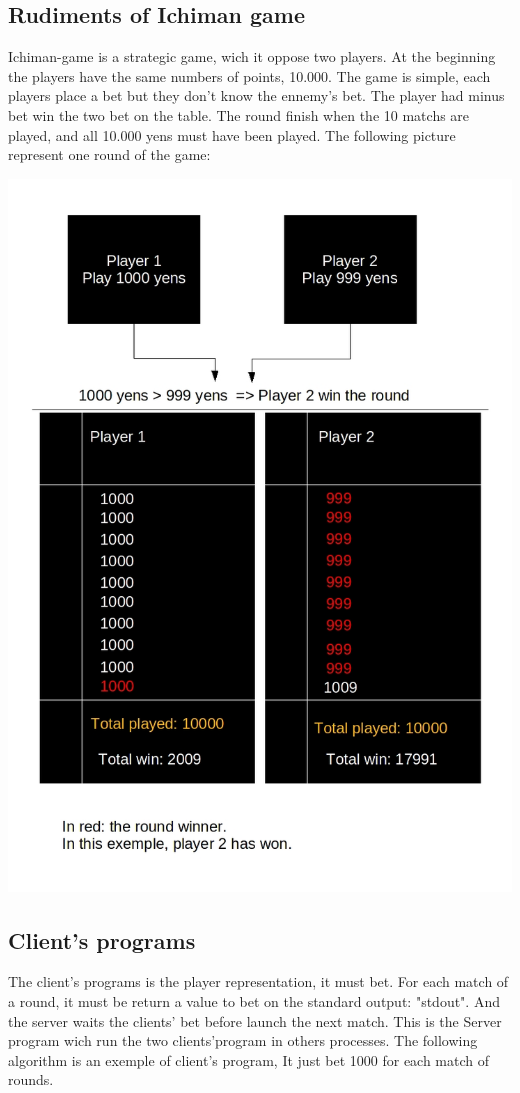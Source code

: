 \documentclass[11pt]{sample}
\begin{document}
\subsection{Rudiments of Ichiman game}
Ichiman-game is a strategic game, wich it oppose two players. At the beginning the players have the same numbers of points, 10.000. The game is simple, each players place a bet but they don't know the ennemy's bet. The player had minus bet win the two bet on the table. The round finish when the 10 matchs are played, and all 10.000 yens must have been played. The following picture represent one round of the game: 
\begin{center}\includegraphics[height=35\baselineskip]{img/match_round_model.jpg}\end{center}
\subsection{Client's programs}
The client's programs is the player representation, it must bet. For each match of a round, it must be return a value to bet on the standard output: "stdout". And the server waits the clients' bet before launch the next match. This is the Server program wich run the two clients'program in others processes. The following algorithm is an exemple of client's program, It just bet 1000 for each match of rounds.
\end{document}
